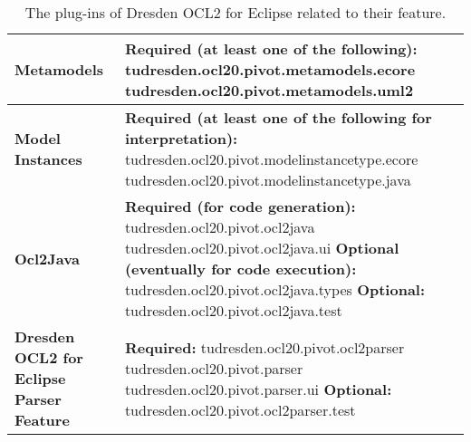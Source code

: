 \begin{table}[h]
\begin{tabular}{|p{4cm}|p{10cm}|}
    \textbf{Metamodels} &
    \textbf{Required (at least one of the following):}\newline
    tudresden.ocl20.pivot.metamodels.ecore\newline
    tudresden.ocl20.pivot.metamodels.uml2\\
    \hline
 
    \textbf{Model Instances} &
    \textbf{Required (at least one of the following for interpretation):}\newline
    tudresden.ocl20.pivot.modelinstancetype.ecore\newline
    tudresden.ocl20.pivot.modelinstancetype.java\\
    \hline
 
    \textbf{Ocl2Java} &
    \textbf{Required (for code generation):}\newline
    tudresden.ocl20.pivot.ocl2java\newline
    tudresden.ocl20.pivot.ocl2java.ui\newline\newline
    \textbf{Optional (eventually for code execution):}\newline
    tudresden.ocl20.pivot.ocl2java.types\newline\newline
    \textbf{Optional:}\newline
    tudresden.ocl20.pivot.ocl2java.test\\
    \hline

    \textbf{Dresden OCL2 for Eclipse Parser Feature} &
    \textbf{Required:}\newline
    tudresden.ocl20.pivot.ocl2parser\newline
    tudresden.ocl20.pivot.parser\newline
    tudresden.ocl20.pivot.parser.ui\newline\newline
    \textbf{Optional:}\newline
    tudresden.ocl20.pivot.ocl2parser.test\\
    \hline
\end{tabular}
\caption{The plug-ins of Dresden OCL2 for Eclipse related to their feature.}
\label{tab:plugins}
\end{table}


